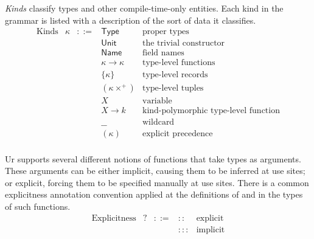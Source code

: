\documentclass{article}
\newcommand{\mt}[1]{\mathsf{#1}}
\begin{document}
\emph{Kinds} classify types and other compile-time-only entities.  Each kind in the grammar is listed with a description of the sort of data it classifies.
$$\begin{array}{rrcll}
  \textrm{Kinds} & \kappa &::=& \mt{Type} & \textrm{proper types} \\
  &&& \mt{Unit} & \textrm{the trivial constructor} \\
  &&& \mt{Name} & \textrm{field names} \\
  &&& \kappa \to \kappa & \textrm{type-level functions} \\
  &&& \{\kappa\} & \textrm{type-level records} \\
  &&& (\kappa\times^+) & \textrm{type-level tuples} \\
  &&& X & \textrm{variable} \\
  &&& X \longrightarrow k & \textrm{kind-polymorphic type-level function} \\
  &&& \_\_ & \textrm{wildcard} \\
  &&& (\kappa) & \textrm{explicit precedence} \\
\end{array}$$

Ur supports several different notions of functions that take types as arguments.  These arguments can be either implicit, causing them to be inferred at use sites; or explicit, forcing them to be specified manually at use sites.  There is a common explicitness annotation convention applied at the definitions of and in the types of such functions.
$$\begin{array}{rrcll}
  \textrm{Explicitness} & ? &::=& :: & \textrm{explicit} \\
  &&& ::: & \textrm{implicit}
\end{array}$$
\end{document}
